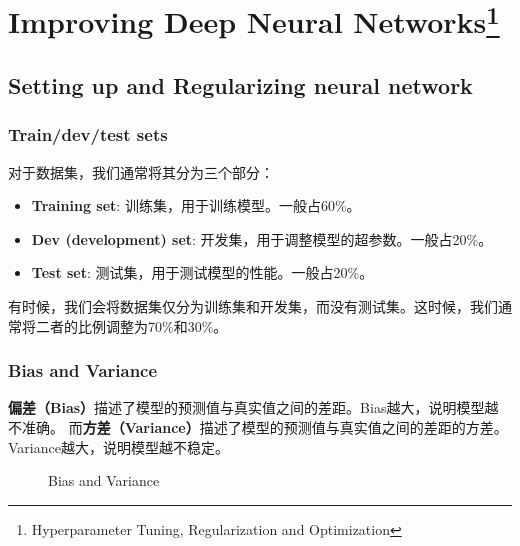 \chapter[Improving Deep Neural Networks]{Improving Deep Neural Networks\setcounter{footnote}{0}\footnote{Hyperparameter Tuning, Regularization and Optimization}}

\section{Setting up and Regularizing neural network}

\subsection{Train/dev/test sets}
对于数据集，我们通常将其分为三个部分：
\begin{itemize}
    \item \textbf{Training set}: 训练集，用于训练模型。一般占60\%。
    \item \textbf{Dev (development) set}: 开发集，用于调整模型的超参数。一般占20\%。
    \item \textbf{Test set}: 测试集，用于测试模型的性能。一般占20\%。
\end{itemize}
有时候，我们会将数据集仅分为训练集和开发集，而没有测试集。这时候，我们通常将二者的比例调整为70\%和30\%。

\subsection{Bias and Variance}
\textbf{偏差（Bias）}描述了模型的预测值与真实值之间的差距。Bias越大，说明模型越不准确。
而\textbf{方差（Variance）}描述了模型的预测值与真实值之间的差距的方差。Variance越大，说明模型越不稳定。

\begin{figure}[h!bt]
    \centering
    \centering
    \caption{Bias and Variance}
    \label{fig:bias-variance}
\end{figure}

